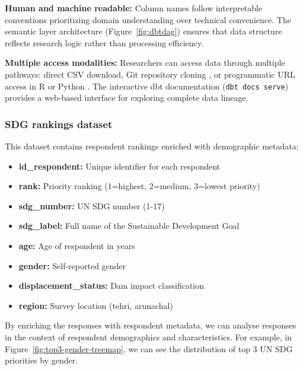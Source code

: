 \textbf{Human and machine readable:} Column names follow interpretable conventions prioritizing domain understanding over technical convenience. The semantic layer architecture (Figure~\ref{fig:dbtdag}) ensures that data structure reflects research logic rather than processing efficiency.

\textbf{Multiple access modalities:} Researchers can access data through multiple pathways: direct CSV download, Git repository cloning \cite{git}, or programmatic URL access in R \cite{r_core} or Python \cite{python}. The interactive dbt documentation (\texttt{dbt docs serve}) \cite{dbt_core} provides a web-based interface for exploring complete data lineage.

\subsubsection{SDG rankings dataset}

This dataset contains respondent rankings enriched with demographic metadata:
\begin{itemize}
  \item \textbf{id\_respondent:} Unique identifier for each respondent
  \item \textbf{rank:} Priority ranking (1=highest, 2=medium, 3=lowest priority)
  \item \textbf{sdg\_number:} UN SDG number (1-17)
  \item \textbf{sdg\_label:} Full name of the Sustainable Development Goal
  \item \textbf{age:} Age of respondent in years
  \item \textbf{gender:} Self-reported gender
  \item \textbf{displacement\_status:} Dam impact classification
  \item \textbf{region:} Survey location (tehri, arunachal)
\end{itemize}

By enriching the responses with respondent metadata, we can analyse responses in the context of respondent demographics and characteristics. For example, in Figure~\ref{fig:top3-gender-treemap}, we can see the distribution of top 3 UN SDG priorities by gender.

